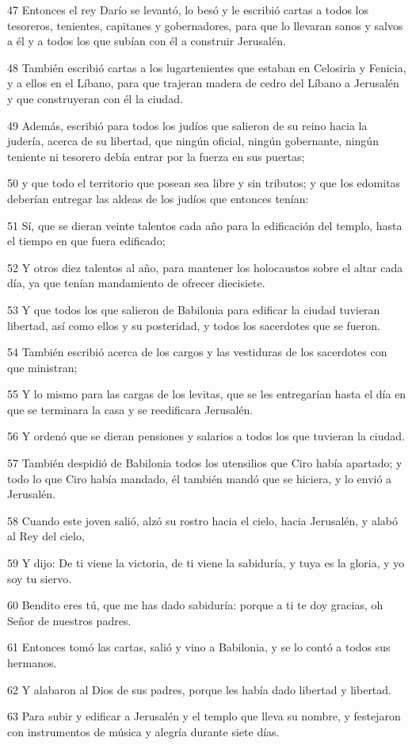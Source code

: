 \par 47 Entonces el rey Darío se levantó, lo besó y le escribió cartas a todos los tesoreros, tenientes, capitanes y gobernadores, para que lo llevaran sanos y salvos a él y a todos los que subían con él a construir Jerusalén.
\par 48 También escribió cartas a los lugartenientes que estaban en Celosiria y Fenicia, y a ellos en el Líbano, para que trajeran madera de cedro del Líbano a Jerusalén y que construyeran con él la ciudad.
\par 49 Además, escribió para todos los judíos que salieron de su reino hacia la judería, acerca de su libertad, que ningún oficial, ningún gobernante, ningún teniente ni tesorero debía entrar por la fuerza en sus puertas;
\par 50 y que todo el territorio que posean sea libre y sin tributos; y que los edomitas deberían entregar las aldeas de los judíos que entonces tenían:
\par 51 Sí, que se dieran veinte talentos cada año para la edificación del templo, hasta el tiempo en que fuera edificado;
\par 52 Y otros diez talentos al año, para mantener los holocaustos sobre el altar cada día, ya que tenían mandamiento de ofrecer diecisiete.
\par 53 Y que todos los que salieron de Babilonia para edificar la ciudad tuvieran libertad, así como ellos y su posteridad, y todos los sacerdotes que se fueron.
\par 54 También escribió acerca de los cargos y las vestiduras de los sacerdotes con que ministran;
\par 55 Y lo mismo para las cargas de los levitas, que se les entregarían hasta el día en que se terminara la casa y se reedificara Jerusalén.
\par 56 Y ordenó que se dieran pensiones y salarios a todos los que tuvieran la ciudad.
\par 57 También despidió de Babilonia todos los utensilios que Ciro había apartado; y todo lo que Ciro había mandado, él también mandó que se hiciera, y lo envió a Jerusalén.
\par 58 Cuando este joven salió, alzó su rostro hacia el cielo, hacia Jerusalén, y alabó al Rey del cielo,
\par 59 Y dijo: De ti viene la victoria, de ti viene la sabiduría, y tuya es la gloria, y yo soy tu siervo.
\par 60 Bendito eres tú, que me has dado sabiduría: porque a ti te doy gracias, oh Señor de nuestros padres.
\par 61 Entonces tomó las cartas, salió y vino a Babilonia, y se lo contó a todos sus hermanos.
\par 62 Y alabaron al Dios de sus padres, porque les había dado libertad y libertad.
\par 63 Para subir y edificar a Jerusalén y el templo que lleva su nombre, y festejaron con instrumentos de música y alegría durante siete días.

